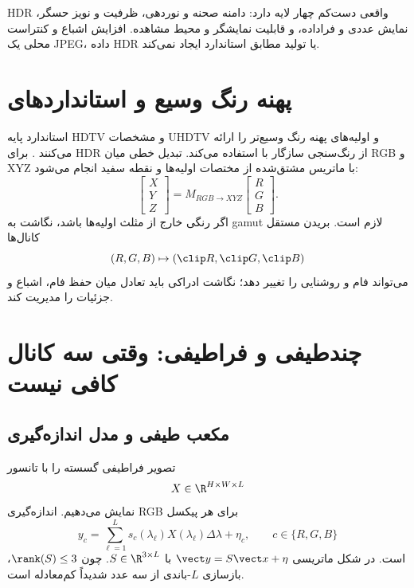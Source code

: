 \begin{keybox}
HDR واقعی دست‌کم چهار لایه دارد: دامنه صحنه و نوردهی، ظرفیت و نویز حسگر، نمایش عددی و فراداده،
و قابلیت نمایشگر و محیط مشاهده. افزایش اشباع و کنتراست محلی یک JPEG، داده HDR یا تولید مطابق
استاندارد ایجاد نمی‌کند.
\end{keybox}

\section{پهنه رنگ وسیع و استانداردهای }

استاندارد  پایه HDTV و  مشخصات UHDTV و اولیه‌های پهنه رنگ وسیع‌تر را
ارائه می‌کنند \cite{iturbt709,iturbt2020}.  برای HDR از رنگ‌سنجی سازگار با
 استفاده می‌کند. تبدیل خطی میان RGB و XYZ با ماتریس مشتق‌شده از مختصات اولیه‌ها و
نقطه سفید انجام می‌شود:
\begin{equation}
\begin{bmatrix}X\\Y\\Z\end{bmatrix}
=M_{RGB\to XYZ}
\begin{bmatrix}R\\G\\B\end{bmatrix}.
\end{equation}
اگر رنگی خارج از مثلث اولیه‌ها باشد، نگاشت به gamut لازم است. بریدن مستقل کانال‌ها
\begin{equation}
(R,G,B)\mapsto(\clip R,\clip G,\clip B)
\end{equation}
می‌تواند فام و روشنایی را تغییر دهد؛ نگاشت ادراکی باید تعادل میان حفظ فام، اشباع و جزئیات را
مدیریت کند.

\section{چندطیفی و فراطیفی: وقتی سه کانال کافی نیست}

\subsection{مکعب طیفی و مدل اندازه‌گیری}

تصویر فراطیفی گسسته را با تانسور
\begin{equation}
X\in\R^{H\times W\times L}
\end{equation}
نمایش می‌دهیم. اندازه‌گیری RGB برای هر پیکسل
\begin{equation}
y_c=\sum_{\ell=1}^{L}s_c(\lambda_\ell)
X(\lambda_\ell)\Delta\lambda+\eta_c,
\qquad c\in\{R,G,B\}
\end{equation}
است. در شکل ماتریسی \(\vect y=S\vect x+\eta\) با \(S\in\R^{3\times L}\). چون
\(\rank(S)\le3\)، بازسازی \(L\)-باندی از سه عدد شدیداً کم‌معادله است.

